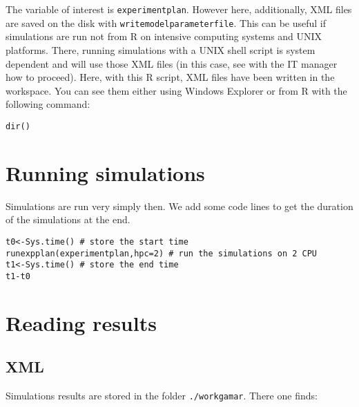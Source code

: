 The  variable of interest is \texttt{experimentplan}. However here, additionally, XML files are saved on the disk with \texttt{writemodelparameterfile}. This can be useful if simulations are run not from R on intensive computing systems and UNIX platforms. There, running simulations with a UNIX shell script is system dependent and will use those XML files (in this case, see with the IT manager how to proceed). Here, with this R script, XML files have been written in the workspace. You can see them either  using Windows Explorer or from R with the following command:

\begin{lstlisting}
dir()
\end{lstlisting}

\section{Running simulations}


Simulations are run very simply then. We add some code lines to get the duration of the simulations at the end.

\begin{lstlisting}
t0<-Sys.time() # store the start time
runexpplan(experimentplan,hpc=2) # run the simulations on 2 CPU
t1<-Sys.time() # store the end time
t1-t0
\end{lstlisting}


\section{Reading results}

\subsection{XML}

Simulations results are stored in the folder \texttt{./workgamar}. There one finds:

